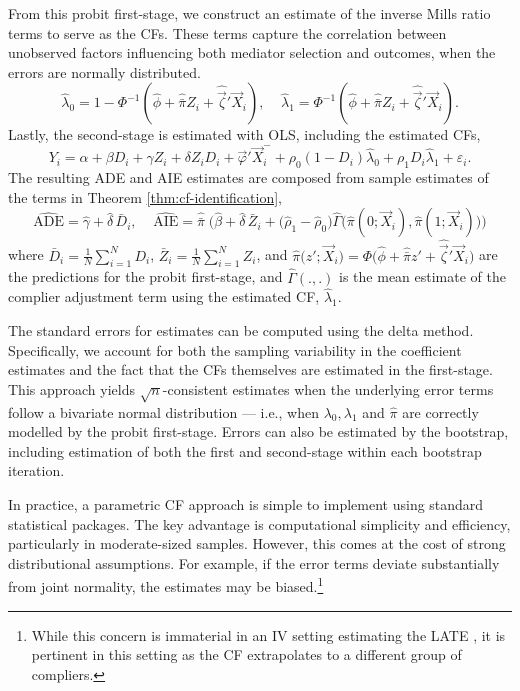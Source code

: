 From this probit first-stage, we construct an estimate of the inverse Mills ratio terms to serve as the CFs.
These terms capture the correlation between unobserved factors influencing both mediator selection and outcomes, when the errors are normally distributed.
\[ \hat \lambda_0 = 1 - \Phi^{-1} \left( \hat\phi + \hat{\bar\pi} Z_i + \hat{\vec\zeta}' \vec X_i \right), \;\;\;\;
\hat \lambda_1 = \Phi^{-1} \left( \hat\phi + \hat{\bar\pi} Z_i + \hat{\vec\zeta}' \vec X_i \right). \]
Lastly, the second-stage is estimated with OLS, including the estimated CFs,
\[ Y_i = \alpha + \beta D_i + \gamma Z_i + \delta Z_i D_i + \vec\varphi' \vec X_i^- 
    + \rho_0(1-D_i) \hat \lambda_0 + \rho_1 D_i \hat \lambda_1 + \varepsilon_i. \]
The resulting ADE and AIE estimates are composed from sample estimates of the terms in Theorem \ref{thm:cf-identification},
\[ \hat{\text{ADE}}
    = \hat{\gamma} + \hat{\delta}\,\bar D_i, \;\;\;\;
    \hat{\text{AIE}}
    = \hat{\bar\pi}\; \Big(
        \hat{\beta} + \hat{\delta}\,\bar Z_i 
        + \big(\hat \rho_1 - \hat \rho_0 \big)
        \hat \Gamma \big( \hat\pi(0;\vec X_i), \hat\pi(1;\vec X_i)\big) \Big) \]
where $\bar D_i = \frac1N \sum_{i=1}^N D_i$, $\bar Z_i = \frac1N \sum_{i=1}^N Z_i$, and $\hat\pi \big(z';\vec X_i \big) = \Phi \big( \hat\phi + \hat{\bar\pi} z' + \hat{\vec\zeta}' \vec X_i \big)$ are the predictions for the probit first-stage, and $\hat\Gamma(.,.)$ is the mean estimate of the complier adjustment term using the estimated CF, $\hat\lambda_1$.

The standard errors for estimates can be computed using the delta method.
Specifically, we account for both the sampling variability in the coefficient estimates and the fact that the CFs themselves are estimated in the first-stage.
This approach yields $\sqrt{n}$-consistent estimates when the underlying error terms follow a bivariate normal distribution --- i.e., when $\lambda_0, \lambda_1$ and $\hat\pi$ are correctly modelled by the probit first-stage.
Errors can also be estimated by the bootstrap, including estimation of both the first and second-stage within each bootstrap iteration.

In practice, a parametric CF approach is simple to implement using standard statistical packages.
The key advantage is computational simplicity and efficiency, particularly in moderate-sized samples.
However, this comes at the cost of strong distributional assumptions.
For example, if the error terms deviate substantially from joint normality, the estimates may be biased.\footnote{
    While this concern is immaterial in an IV setting estimating the LATE \citep{kline2019heckits}, it is pertinent in this setting as the CF extrapolates to a different group of compliers.
}

